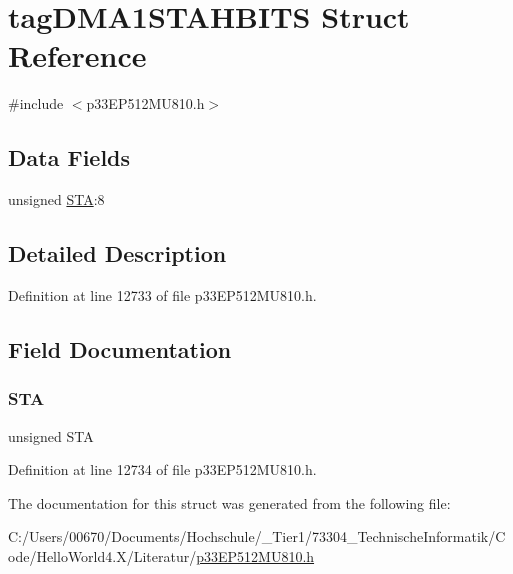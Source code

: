 \hypertarget{structtag_d_m_a1_s_t_a_h_b_i_t_s}{}\section{tag\+D\+M\+A1\+S\+T\+A\+H\+B\+I\+TS Struct Reference}
\label{structtag_d_m_a1_s_t_a_h_b_i_t_s}


{\ttfamily \#include $<$p33\+E\+P512\+M\+U810.\+h$>$}

\subsection*{Data Fields}
\begin{DoxyCompactItemize}
\item 
unsigned \hyperlink{structtag_d_m_a1_s_t_a_h_b_i_t_s_a0eec78ddd2c12af678d5fab70fe62d14}{S\+TA}\+:8
\end{DoxyCompactItemize}


\subsection{Detailed Description}


Definition at line 12733 of file p33\+E\+P512\+M\+U810.\+h.



\subsection{Field Documentation}
\mbox{\label{structtag_d_m_a1_s_t_a_h_b_i_t_s_a0eec78ddd2c12af678d5fab70fe62d14}} 
\subsubsection{\texorpdfstring{S\+TA}{STA}}
{\footnotesize\ttfamily unsigned S\+TA}



Definition at line 12734 of file p33\+E\+P512\+M\+U810.\+h.



The documentation for this struct was generated from the following file\+:\begin{DoxyCompactItemize}
\item 
C\+:/\+Users/00670/\+Documents/\+Hochschule/\+\_\+\+Tier1/73304\+\_\+\+Technische\+Informatik/\+Code/\+Hello\+World4.\+X/\+Literatur/\hyperlink{p33_e_p512_m_u810_8h}{p33\+E\+P512\+M\+U810.\+h}\end{DoxyCompactItemize}

